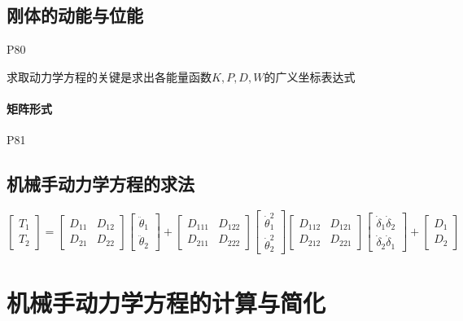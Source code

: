 \documentclass[11pt]{book}
\begin{document}
\subsection{刚体的动能与位能}

P80

求取动力学方程的关键是求出各能量函数$K, P, D, W$的广义坐标表达式

\paragraph{矩阵形式}%
\label{par:ju_zhen_xing_shi_}

P81

\subsection{机械手动力学方程的求法}

$$
	\begin{bmatrix}
		T_1 \\
		T_2
	\end{bmatrix}
	=
	\begin{bmatrix}
		D_{11} & D_{12} \\
		D_{21} & D_{22}
	\end{bmatrix}
	\begin{bmatrix}
		\ddot\theta_1 \\
		\ddot\theta_2
	\end{bmatrix}
	+
	\begin{bmatrix}
		D_{111} & D_{122} \\
		D_{211} & D_{222}
	\end{bmatrix}
	\begin{bmatrix}
		\dot\theta_1^2 \\
		\dot\theta_2^2
	\end{bmatrix}
	\begin{bmatrix}
		D_{112} & D_{121} \\
		D_{212} & D_{221}
	\end{bmatrix}
	\begin{bmatrix}
		\dot\delta_1 \dot\delta_2 \\
		\dot\delta_2 \dot\delta_1
	\end{bmatrix}
	+
	\begin{bmatrix}
		D_1 \\
		D_2
	\end{bmatrix}
$$

\section{机械手动力学方程的计算与简化}
\end{document}
